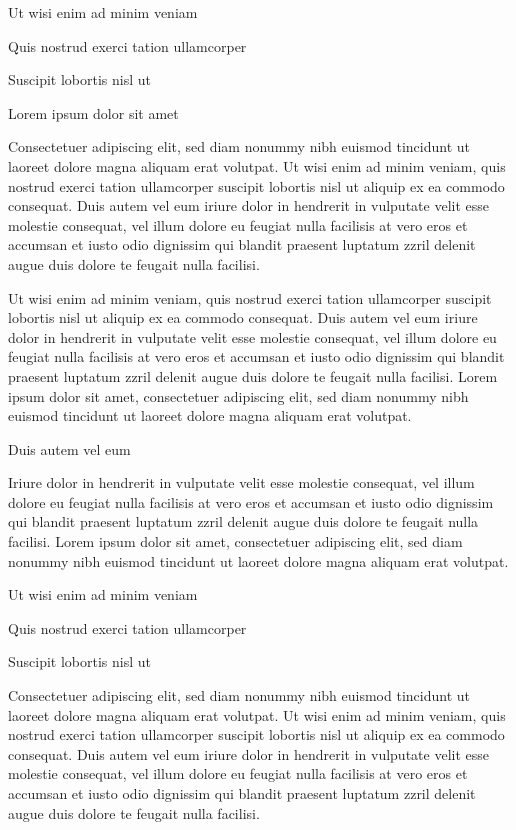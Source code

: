 \documentclass[11pt,twoside]{article}\makeatletter
\begin{document}
Ut wisi enim ad minim veniam\par
Quis nostrud exerci tation ullamcorper \par
Suscipit lobortis nisl ut \par
Lorem ipsum dolor sit amet\par
Consectetuer adipiscing elit, sed diam nonummy nibh euismod       tincidunt ut laoreet dolore magna aliquam erat volutpat. Ut wisi enim       ad minim veniam, quis nostrud exerci tation ullamcorper suscipit       lobortis nisl ut aliquip ex ea commodo consequat. Duis autem vel eum       iriure dolor in hendrerit in vulputate velit esse molestie consequat,       vel illum dolore eu feugiat nulla facilisis at vero eros et accumsan       et iusto odio dignissim qui blandit praesent luptatum zzril delenit       augue duis dolore te feugait nulla facilisi.\par
Ut wisi enim ad minim veniam, quis nostrud exerci tation       ullamcorper suscipit lobortis nisl ut aliquip ex ea commodo       consequat. Duis autem vel eum iriure dolor in hendrerit in vulputate       velit esse molestie consequat, vel illum dolore eu feugiat nulla       facilisis at vero eros et accumsan et iusto odio dignissim qui blandit       praesent luptatum zzril delenit augue duis dolore te feugait nulla       facilisi. Lorem ipsum dolor sit amet, consectetuer adipiscing elit,       sed diam nonummy nibh euismod tincidunt ut laoreet dolore magna       aliquam erat volutpat. \par
Duis autem vel eum \par
Iriure dolor in hendrerit in vulputate velit esse molestie       consequat, vel illum dolore eu feugiat nulla facilisis at vero eros et       accumsan et iusto odio dignissim qui blandit praesent luptatum zzril       delenit augue duis dolore te feugait nulla facilisi. Lorem ipsum dolor       sit amet, consectetuer adipiscing elit, sed diam nonummy nibh euismod       tincidunt ut laoreet dolore magna aliquam erat volutpat. \par
Ut wisi enim ad minim veniam\par
Quis nostrud exerci tation ullamcorper \par
Suscipit lobortis nisl ut \par
Consectetuer adipiscing elit, sed diam nonummy nibh euismod       tincidunt ut laoreet dolore magna aliquam erat volutpat. Ut wisi enim       ad minim veniam, quis nostrud exerci tation ullamcorper suscipit       lobortis nisl ut aliquip ex ea commodo consequat. Duis autem vel eum       iriure dolor in hendrerit in vulputate velit esse molestie consequat,       vel illum dolore eu feugiat nulla facilisis at vero eros et accumsan       et iusto odio dignissim qui blandit praesent luptatum zzril delenit       augue duis dolore te feugait nulla facilisi.\par
\end{document}
